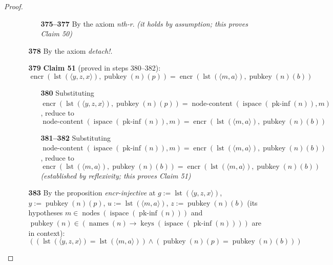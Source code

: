 \documentclass[11pt]{article}
\theoremstyle{plain}
\begin{document}
\begin{proof}
\begin{itemize}[leftmargin=2.8em, itemsep=4pt, parsep=1pt]
\begin{itemize}[leftmargin=2.8em, itemsep=4pt, parsep=1pt]
  \begin{itemize}[leftmargin=2.8em, itemsep=4pt, parsep=1pt]
  \item[\textbf{375--377}] By the axiom \emph{nth-r}.  \emph{(it holds by assumption; this proves Claim 50)}
  \end{itemize}
  \item[\textbf{378}] By the axiom \emph{detach!}.
  \item[\textbf{379}] \textbf{Claim 51} (proved in steps 380--382):
\begin{equation*}
\operatorname{encr}(\operatorname{lst}(\langle y, z, x \rangle), \operatorname{pubkey}(n)(p)) = \operatorname{encr}(\operatorname{lst}(\langle m, a \rangle), \operatorname{pubkey}(n)(b))
\end{equation*}

  \begin{itemize}[leftmargin=2.8em, itemsep=4pt, parsep=1pt]
  \item[\textbf{380}] Substituting $\operatorname{encr}(\operatorname{lst}(\langle y, z, x \rangle), \operatorname{pubkey}(n)(p)) = \operatorname{node\text{-}content}(\operatorname{ispace}(\operatorname{pk\text{-}inf}(n)), m)$, reduce to
\begin{equation*}
\operatorname{node\text{-}content}(\operatorname{ispace}(\operatorname{pk\text{-}inf}(n)), m) = \operatorname{encr}(\operatorname{lst}(\langle m, a \rangle), \operatorname{pubkey}(n)(b))
\end{equation*}

  \item[\textbf{381--382}] Substituting $\operatorname{node\text{-}content}(\operatorname{ispace}(\operatorname{pk\text{-}inf}(n)), m) = \operatorname{encr}(\operatorname{lst}(\langle m, a \rangle), \operatorname{pubkey}(n)(b))$, reduce to
\begin{equation*}
\operatorname{encr}(\operatorname{lst}(\langle m, a \rangle), \operatorname{pubkey}(n)(b)) = \operatorname{encr}(\operatorname{lst}(\langle m, a \rangle), \operatorname{pubkey}(n)(b))
\end{equation*}
  \emph{(established by reflexivity; this proves Claim 51)}
  \end{itemize}
  \item[\textbf{383}] By the proposition \emph{encr-injective} at $g := \operatorname{lst}(\langle y, z, x \rangle)$, $y := \operatorname{pubkey}(n)(p)$, $u := \operatorname{lst}(\langle m, a \rangle)$, $z := \operatorname{pubkey}(n)(b)$ (its hypotheses $m \in \operatorname{nodes}(\operatorname{ispace}(\operatorname{pk\text{-}inf}(n)))$ and $\operatorname{pubkey}(n) \in (\operatorname{names}(n) \to \operatorname{keys}(\operatorname{ispace}(\operatorname{pk\text{-}inf}(n))))$ are in context):
\begin{equation*}
((\operatorname{lst}(\langle y, z, x \rangle) = \operatorname{lst}(\langle m, a \rangle)) \wedge (\operatorname{pubkey}(n)(p) = \operatorname{pubkey}(n)(b)))
\end{equation*}


\end{itemize}
\end{itemize}
\end{proof}
\end{document}
